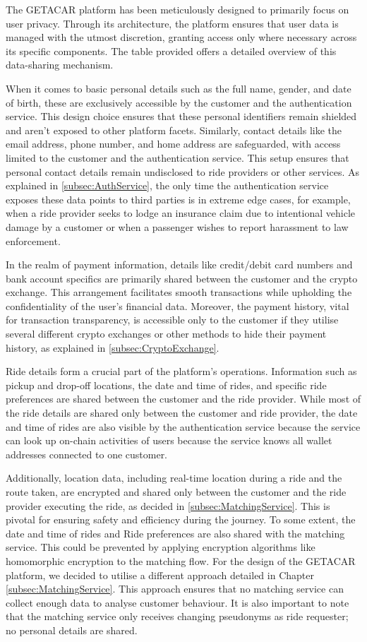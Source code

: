 The GETACAR platform has been meticulously designed to primarily focus on user privacy. Through its architecture, the platform ensures that user data is managed with the utmost discretion, granting access only where necessary across its specific components. The table provided offers a detailed overview of this data-sharing mechanism.


When it comes to basic personal details such as the full name, gender, and date of birth, these are exclusively accessible by the customer and the authentication service. This design choice ensures that these personal identifiers remain shielded and aren't exposed to other platform facets. Similarly, contact details like the email address, phone number, and home address are safeguarded, with access limited to the customer and the authentication service. This setup ensures that personal contact details remain undisclosed to ride providers or other services. As explained in \ref{subsec:AuthService}, the only time the authentication service exposes these data points to third parties is in extreme edge cases, for example, when a  ride provider seeks to lodge an insurance claim due to intentional vehicle damage by a customer or when a passenger wishes to report harassment to law enforcement.

In the realm of payment information, details like credit/debit card numbers and bank account specifics are primarily shared between the customer and the crypto exchange. This arrangement facilitates smooth transactions while upholding the confidentiality of the user's financial data. Moreover, the payment history, vital for transaction transparency, is accessible only to the customer if they utilise several different crypto exchanges or other methods to hide their payment history, as explained in \ref{subsec:CryptoExchange}.

Ride details form a crucial part of the platform's operations. Information such as pickup and drop-off locations, the date and time of rides, and specific ride preferences are shared between the customer and the ride provider. While most of the ride details are shared only between the customer and ride provider, the date and time of rides are also visible by the authentication service because the service can look up on-chain activities of users because the service knows all wallet addresses connected to one customer.


Additionally, location data, including real-time location during a ride and the route taken, are encrypted and shared only between the customer and the ride provider executing the ride, as decided in \ref{subsec:MatchingService}. This is pivotal for ensuring safety and efficiency during the journey. To some extent, the date and time of rides and Ride preferences are also shared with the matching service. This could be prevented by applying encryption algorithms like homomorphic encryption to the matching flow. For the design of the GETACAR platform, we decided to utilise a different approach detailed in Chapter \ref{subsec:MatchingService}. This approach ensures that no matching service can collect enough data to analyse customer behaviour. It is also important to note that the matching service only receives changing pseudonyms as ride requester; no personal details are shared. 

